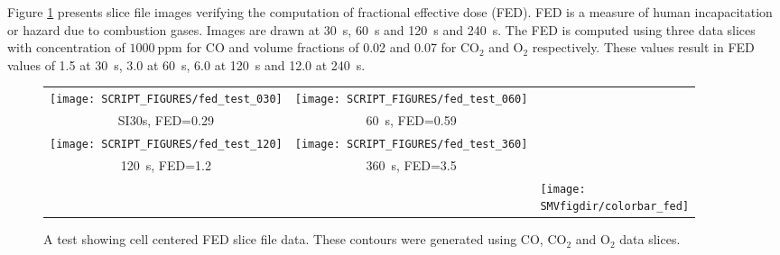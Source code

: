 Figure \ref{figfedslicetest} presents slice file images verifying the computation
of fractional effective dose (FED).  FED is a measure of human incapacitation or
hazard due to combustion gases\cite{SFPE:Purser}. Images are drawn at \SI{30}{s},
\SI{60}{s} and \SI{120}{s} and \SI{240}{s}. The FED is computed using three data slices with concentration of $1000~\mathrm{ppm}$ for $\mathrm{CO}$ and volume fractions of 0.02 and 0.07 for $\mathrm{CO_2}$ and $\mathrm{O_2}$ respectively. These values result in FED values of 1.5 at \SI{30}{s}, 3.0 at \SI{60}{s}, 6.0 at \SI{120}{s} and 12.0 at \SI{240}{s}.

\begin{figure}[bph]
\begin{center}
\begin{tabular}{ccp{1.0in}}
 \texttt{[image: SCRIPT\_FIGURES/fed\_test\_030]}&
 \texttt{[image: SCRIPT\_FIGURES/fed\_test\_060]}\\
SI{30}{s}, FED=0.29&\SI{60}{s}, FED=0.59\\
 \texttt{[image: SCRIPT\_FIGURES/fed\_test\_120]}&
 \texttt{[image: SCRIPT\_FIGURES/fed\_test\_360]}\\
\SI{120}{s}, FED=1.2&3\SI{60}{s}, FED=3.5\\
&&\raisebox{0.25in}[0pt]{\texttt{[image: \\SMVfigdir/colorbar\_fed]}}
 \end{tabular}
\end{center}
 \caption[A test showing cell centered FED slice file data]{A test showing cell
 centered FED slice file data.  These contours were generated using $\mathrm{CO}$,
 $\mathrm{CO_2}$ and $\mathrm{O_2}$ data slices. }
\label{figfedslicetest}%
\end{figure}

